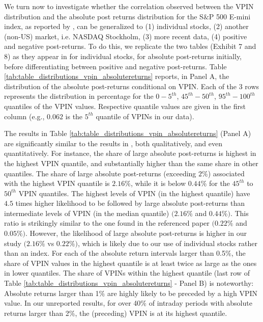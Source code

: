 We turn now to investigate whether the correlation observed between the VPIN distribution and the absolute post returns distribution for the S$\&$P 500 E-mini index, as reported by  \cite{Easley2011microstructure},  can be generalized to (1) individual stocks, (2) another (non-US) market, i.e. NASDAQ Stockholm, (3) more recent data, (4) positive and negative post-returns. To do this, we replicate the two tables (Exhibit 7 and 8) as they appear in  \cite{Easley2011microstructure} for individual stocks, for absolute post-returns initially, before differentiating between positive and negative post-returns. Table \ref{tab:table_distributions_vpin_absolutereturns} reports, in Panel A, the distribution of the absolute post-returns conditional on VPIN. Each of the 3 rows represents the distribution in percentage for the \(0-5^{th}\), \(45^{th}-50^{th}\), 
\(95^{th}-100^{th}\) quantiles of the VPIN values. Respective quantile values are given in the first column (e.g., \(0.062\) is the $5^{th}$ quantile of VPINs in our data). %


The results in Table \ref{tab:table_distributions_vpin_absolutereturns} (Panel A) are significantly similar to the results in  \cite{Easley2011microstructure}, both qualitatively, and even quantitatively. For instance, the share of large absolute post-returns is highest in the highest VPIN quantile, and substantially higher than the same share in other quantiles. The share of large absolute post-returns (exceeding \(2\%\)) associated with the highest VPIN quantile is \(2.16\%\), while it is below \(0.44\%\) for the $45^{th}$ to $50^{th}$ VPIN quantiles. The highest levels of VPIN (in the highest quantile) have \(4.5\) times higher likelihood to be followed by large absolute post-returns than intermediate levels of VPIN (in the median quantile) $(2.16\%$ and $0.44\%)$. This ratio is strikingly similar to the one found in the referenced paper $(0.22\%$ and $0.05\%)$. 
However, the likelihood of large absolute post-returns is higher in our study $(2.16\%$ vs $0.22\%)$, which is likely due to our use of individual stocks rather than an index. 
For each of the absolute return intervals larger than 0.5$\%$, the share of VPIN values in the highest quantile is at least twice as large as the ones in lower quantiles. The share of VPINs within the highest quantile (last row of Table \ref{tab:table_distributions_vpin_absolutereturns} - Panel B) is noteworthy: Absolute returns larger than 1$\%$ are highly likely to be preceded by a high VPIN value. In our unreported results, for over 40$\%$ of intraday periods with absolute returns larger than 2\%, the (preceding) VPIN is at its highest quantile.

